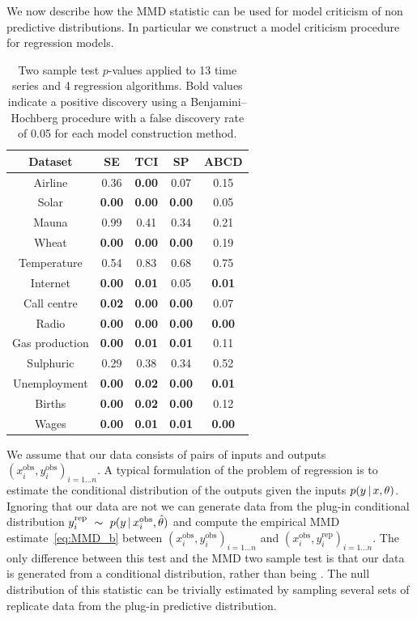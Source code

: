 \documentclass{article} %
\begin{document}
We now describe how the MMD statistic can be used for model criticism of non \iid predictive distributions.
In particular we construct a model criticism procedure for regression models.

\begin{table}
\small
\center
\begin{tabular}{|c|c|c|c|c|}
\hline
Dataset & SE & TCI & SP & ABCD \\
\hline
Airline        & 0.36 & \bf{0.00} & 0.07 & 0.15 \\
Solar          & \bf{0.00} & \bf{0.00} & \bf{0.00} & 0.05 \\
Mauna          & 0.99 & 0.41 & 0.34 & 0.21 \\
Wheat          & \bf{0.00} & \bf{0.00} & \bf{0.00} & 0.19 \\
Temperature    & 0.54 & 0.83 & 0.68 & 0.75 \\
Internet       & \bf{0.00} & \bf{0.01} & 0.05 & \bf{0.01} \\
Call centre    & \bf{0.02} & \bf{0.00} & \bf{0.00} & 0.07 \\
Radio          & \bf{0.00} & \bf{0.00} & \bf{0.00} & \bf{0.00} \\
Gas production & \bf{0.00} & \bf{0.01} & \bf{0.01} & 0.11 \\
Sulphuric      & 0.29 & 0.38 & 0.34 & 0.52 \\
Unemployment   & \bf{0.00} & \bf{0.02} & \bf{0.00} & \bf{0.01} \\
Births         & \bf{0.00} & \bf{0.02} & \bf{0.00} & 0.12 \\
Wages          & \bf{0.00} & \bf{0.01} & \bf{0.01} & \bf{0.00} \\
\hline
\end{tabular}
\caption{Two sample test $p$-values applied to 13 time series and 4 regression algorithms.
Bold values indicate a positive discovery using a Benjamini--Hochberg procedure with a false discovery rate of 0.05 for each model construction method.}
\label{table:ABCD-p-values}
\end{table}

We assume that our data consists of pairs of inputs and outputs ${(x_i^\textrm{obs}, y_i^\textrm{obs})_{i=1\ldots n}}$.
A typical formulation of the problem of regression is to estimate the conditional distribution of the outputs given the inputs ${p(y\,|\, x, \theta)}$.
Ignoring that our data are not \iid we can generate data from the plug-in conditional distribution ${y_i^\textrm{rep} \ \sim\  p(y\,|\, x_i^\textrm{obs}, \hat\theta)}$ and compute the empirical MMD estimate~\eqref{eq:MMD_b} between ${(x_i^\textrm{obs}, y_i^\textrm{obs})_{i=1\ldots n}}$ and ${(x_i^\textrm{obs}, y_i^\textrm{rep})_{i=1\ldots n}}$.
The only difference between this test and the MMD two sample test is that our data is generated from a conditional distribution, rather than being \iid.
The null distribution of this statistic can be trivially estimated by sampling several sets of replicate data from the plug-in predictive distribution.
\end{document}

